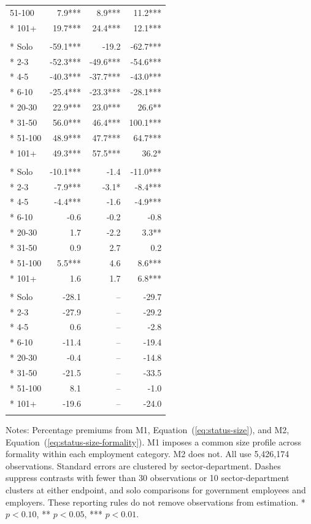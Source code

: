 \begin{longtable}{lrrr}
51-100 & 7.9*** & 8.9*** & 11.2*** \\*
101+ & 19.7*** & 24.4*** & 12.1*** \\
\addlinespace
\multicolumn{4}{l}{\textit{Employers}}\\*
Solo & -59.1*** & -19.2 & -62.7*** \\*
2-3 & -52.3*** & -49.6*** & -54.6*** \\*
4-5 & -40.3*** & -37.7*** & -43.0*** \\*
6-10 & -25.4*** & -23.3*** & -28.1*** \\*
20-30 & 22.9*** & 23.0*** & 26.6** \\*
31-50 & 56.0*** & 46.4*** & 100.1*** \\*
51-100 & 48.9*** & 47.7*** & 64.7*** \\*
101+ & 49.3*** & 57.5*** & 36.2* \\
\addlinespace
\multicolumn{4}{l}{\textit{Day laborers}}\\*
Solo & -10.1*** & -1.4 & -11.0*** \\*
2-3 & -7.9*** & -3.1* & -8.4*** \\*
4-5 & -4.4*** & -1.6 & -4.9*** \\*
6-10 & -0.6 & -0.2 & -0.8 \\*
20-30 & 1.7 & -2.2 & 3.3** \\*
31-50 & 0.9 & 2.7 & 0.2 \\*
51-100 & 5.5*** & 4.6 & 8.6*** \\*
101+ & 1.6 & 1.7 & 6.8*** \\
\addlinespace
\multicolumn{4}{l}{\textit{Other workers}}\\*
Solo & -28.1 & -- & -29.7 \\*
2-3 & -27.9 & -- & -29.2 \\*
4-5 & 0.6 & -- & -2.8 \\*
6-10 & -11.4 & -- & -19.4 \\*
20-30 & -0.4 & -- & -14.8 \\*
31-50 & -21.5 & -- & -33.5 \\*
51-100 & 8.1 & -- & -1.0 \\*
101+ & -19.6 & -- & -24.0 \\
\addlinespace
\end{longtable}
\noindent\footnotesize Notes: Percentage premiums from M1, Equation~(\ref{eq:status-size}), and M2, Equation~(\ref{eq:status-size-formality}). M1 imposes a common size profile across formality within each employment category. M2 does not. All use 5,426,174 observations. Standard errors are clustered by sector-department. Dashes suppress contrasts with fewer than 30 observations or 10 sector-department clusters at either endpoint, and solo comparisons for government employees and employers. These reporting rules do not remove observations from estimation. * $p<0.10$, ** $p<0.05$, *** $p<0.01$.
\endgroup
